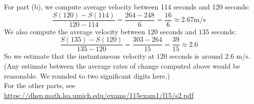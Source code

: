 \documentclass[11pt]{exam}
\begin{document}
\begin{questions}
\begin{solution}
  For part (b), we compute average velocity between 114 seconds and
  120 seconds:
  \[\frac{S(120)-S(114)}{120-114}
=\frac{264-248}{6}
= \frac{16}{6}
\approx 2.67 \text{m/s}
\]
We also compute the average velocity between \(120\) seconds and
\(135\) seconds:
\[\frac{S(135)-S(120)}{135-120} =
\frac{303-264}{15}=\frac{39}{15}\approx2.6
\]
So we estimate that the instantaneous velocity at \(120\) seconds is
around \(2.6\) m/s. (Any estimate between the average rates of change
computed above would be reasonable. We rounded to two significant
digits here.)\\
  For the other parts, see
  \href{https://dhsp.math.lsa.umich.edu/exams/115exam1/f15/s2.pdf}{https://dhsp.math.lsa.umich.edu/exams/115exam1/f15/s2.pdf}
\end{solution}
\end{questions}
\end{document}
